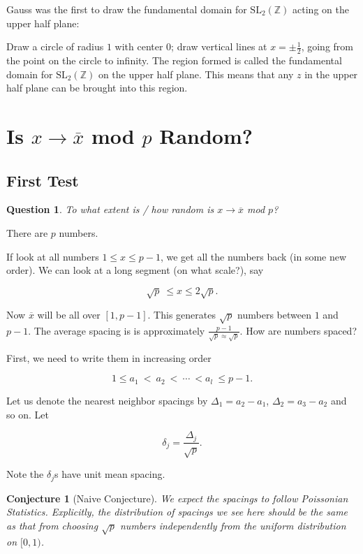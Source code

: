 \documentclass[12pt,letterpaper]{report}
\newcommand\be{\begin{equation}}
\newcommand\ee{\end{equation}}
\newcommand{\Z}{\ensuremath{\mathbb{Z}}}
\newcommand{\foh}{\frac{1}{2}}  %
\newtheorem{conj}[thm]{Conjecture}
\newtheorem{que}[thm]{Question}
\begin{document}
Gauss was the first to draw the fundamental domain for
$\text{SL}_2(\Z)$ acting on the upper half plane:

Draw a circle of radius $1$ with center $0$; draw vertical lines
at $x = \pm \foh$, going from the point on the circle to infinity.
The region formed is called the fundamental domain for
$\text{SL}_2(\Z)$ on the upper half plane. This means that any $z$
in the upper half plane can be brought into this region.

\section{Is $x \to \overline{x}$ mod $p$ Random?}


\subsection{First Test}

\begin{que} To what extent is / how random is $x \to \overline{x}$ mod
$p$? \end{que}

There are $p$ numbers.

If look at all numbers $1 \le x \le p-1$, we get all the numbers
back (in some new order). We can look at a long segment (on what
scale?), say

\be \sqrt{p} \ \le x \le 2\sqrt{p}. \ee

Now $\overline{x}$ will be all over $[1,p-1]$. This generates
$\sqrt{p}$ numbers between $1$ and $p-1$. The average spacing is
is approximately $\frac{p-1}{\sqrt{p} \approx \sqrt{p}}$. How are
numbers spaced?

First, we need to write them in increasing order

\be 1 \le a_1 \ < \ a_2 \ < \ \cdots \ < a_l \ \le p-1. \ee

Let us denote the nearest neighbor spacings by $\Delta_1 = a_2 -
a_1$, $\Delta_2 = a_3 - a_2$ and so on. Let

\be \delta_j = \frac{\Delta_j}{\sqrt{p}}. \ee

Note the $\delta_j$s have unit mean spacing.

\begin{conj}[Naive Conjecture] We expect the spacings to follow
Poissonian Statistics. Explicitly, the distribution of spacings we
see here should be the same as that from choosing $\sqrt{p}$
numbers independently from the uniform distribution on $[0,1)$.
\end{conj}
\end{document}
